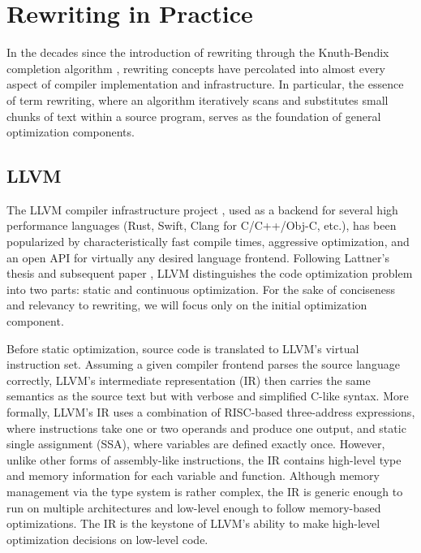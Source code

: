 \documentclass{article}
\begin{document}
\section{Rewriting in Practice}
In the decades since the introduction of rewriting through the Knuth-Bendix completion algorithm \cite{baader1998term}, rewriting concepts have percolated into almost every aspect of compiler implementation and infrastructure. In particular, the essence of term rewriting, where an algorithm iteratively scans and substitutes small chunks of text within a source program, serves as the foundation of general optimization components.

\subsection{LLVM}

The LLVM compiler infrastructure project \cite{llvmWebsite}, used as a backend for several high performance languages (Rust, Swift, Clang for C/C++/Obj-C, etc.), has been popularized by characteristically fast compile times, aggressive optimization, and an open API for virtually any desired language frontend. Following Lattner's thesis \cite{Lattner:MSThesis02} and subsequent paper \cite{llvm2004Compilation}, LLVM distinguishes the code optimization problem into two parts: static and continuous optimization. For the sake of conciseness and relevancy to rewriting, we will focus only on the initial optimization component.

Before static optimization, source code is translated to LLVM's virtual instruction set. Assuming a given compiler frontend parses the source language correctly, LLVM's intermediate representation (IR) then carries the same semantics as the source text but with verbose and simplified C-like syntax. More formally, LLVM's IR uses a combination of RISC-based three-address expressions, where instructions take one or two operands and produce one output, and static single assignment (SSA), where variables are defined exactly once. However, unlike other forms of assembly-like instructions, the IR contains high-level type and memory information for each variable and function. Although memory management via the type system is rather complex, the IR is generic enough to run on multiple architectures and low-level enough to follow memory-based optimizations. The IR is the keystone of LLVM's ability to make high-level optimization decisions on low-level code.
\end{document}
